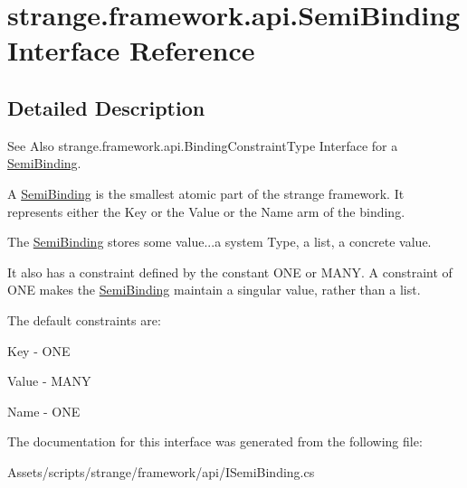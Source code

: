 \hypertarget{interfacestrange_1_1framework_1_1api_1_1_semi_binding}{\section{strange.\-framework.\-api.\-Semi\-Binding Interface Reference}
\label{interfacestrange_1_1framework_1_1api_1_1_semi_binding}
}


\subsection{Detailed Description}
\begin{DoxySeeAlso}{See Also}
strange.\-framework.\-api.\-Binding\-Constraint\-Type Interface for a \hyperlink{interfacestrange_1_1framework_1_1api_1_1_semi_binding}{Semi\-Binding}.
\end{DoxySeeAlso}
A \hyperlink{interfacestrange_1_1framework_1_1api_1_1_semi_binding}{Semi\-Binding} is the smallest atomic part of the strange framework. It represents either the Key or the Value or the Name arm of the binding. \par
 The \hyperlink{interfacestrange_1_1framework_1_1api_1_1_semi_binding}{Semi\-Binding} stores some value...a system Type, a list, a concrete value. \par
 It also has a constraint defined by the constant O\-N\-E or M\-A\-N\-Y. A constraint of O\-N\-E makes the \hyperlink{interfacestrange_1_1framework_1_1api_1_1_semi_binding}{Semi\-Binding} maintain a singular value, rather than a list. \par
 The default constraints are\-: 
\begin{DoxyItemize}
\item Key -\/ O\-N\-E 
\item Value -\/ M\-A\-N\-Y 
\item Name -\/ O\-N\-E 
\end{DoxyItemize}

The documentation for this interface was generated from the following file\-:\begin{DoxyCompactItemize}
\item 
Assets/scripts/strange/framework/api/I\-Semi\-Binding.\-cs\end{DoxyCompactItemize}
